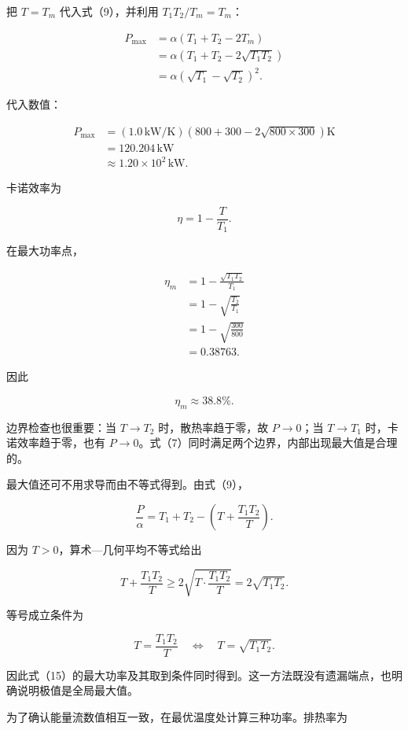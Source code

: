 \documentclass[12pt,a4paper,UTF8]{ctexart}
\begin{document}
把 \(T=T_m\) 代入式（9），并利用 \(T_1T_2/T_m=T_m\)：

\[
\begin{aligned}
P_{\max}
&=\alpha(T_1+T_2-2T_m)\\
&=\alpha\left(T_1+T_2-2\sqrt{T_1T_2}\right)\\
&=\alpha(\sqrt{T_1}-\sqrt{T_2})^2.
\end{aligned} \tag{15}
\]

代入数值：

\[
\begin{aligned}
P_{\max}
&=(1.0\,\mathrm{kW/K})
\left(800+300-2\sqrt{800\times300}\right)\mathrm K\\
&=120.204\,\mathrm{kW}\\
&\approx\boxed{1.20\times10^2\,\mathrm{kW}}.
\end{aligned} \tag{16}
\]

卡诺效率为

\[
\eta=1-\frac{T}{T_1}. \tag{17}
\]

在最大功率点，

\[
\begin{aligned}
\eta_m
&=1-\frac{\sqrt{T_1T_2}}{T_1}\\
&=1-\sqrt{\frac{T_2}{T_1}}\\
&=1-\sqrt{\frac{300}{800}}\\
&=0.38763.
\end{aligned} \tag{18}
\]

因此

\[
\boxed{\eta_m\approx38.8\%}. \tag{19}
\]

边界检查也很重要：当 \(T\to T_2\) 时，散热率趋于零，故 \(P\to0\)；当
\(T\to T_1\) 时，卡诺效率趋于零，也有
\(P\to0\)。式（7）同时满足两个边界，内部出现最大值是合理的。

最大值还可不用求导而由不等式得到。由式（9），

\[
\frac P\alpha
=T_1+T_2-\left(T+\frac{T_1T_2}{T}\right). \tag{20}
\]

因为 \(T>0\)，算术---几何平均不等式给出

\[
T+\frac{T_1T_2}{T}
\geqslant2\sqrt{T\cdot\frac{T_1T_2}{T}}
=2\sqrt{T_1T_2}. \tag{21}
\]

等号成立条件为

\[
T=\frac{T_1T_2}{T}
\quad\Longleftrightarrow\quad
T=\sqrt{T_1T_2}. \tag{22}
\]

因此式（15）的最大功率及其取到条件同时得到。这一方法既没有遗漏端点，也明确说明极值是全局最大值。

为了确认能量流数值相互一致，在最优温度处计算三种功率。排热率为
\end{document}
